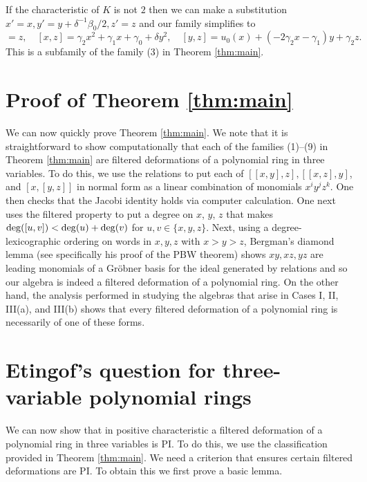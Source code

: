 \documentclass[a4paper,11pt,twoside,notitlepage,reqno]{amsart}
\theoremstyle{plain}
\numberwithin{thm}{section}
\theoremstyle{definition}
\begin{document}
If the characteristic of $K$ is not $2$ then we can make a substitution $x'=x, y'=y+\delta^{-1}\beta_0/2, z'=z$ and our family simplifies to
\begin{equation}
[x,y]=z,\quad [x,z]= \gamma_2 x^2 + \gamma_1 x + \gamma_0 +\delta y^2, \quad [y,z]=u_0(x) + (-2\gamma_2 x-\gamma_1)y +  \gamma_2 z.
\end{equation}
This is a subfamily of the family (3) in Theorem \ref{thm:main}.

\section{Proof of Theorem \ref{thm:main}}\label{sec:main}
We can now quickly prove Theorem \ref{thm:main}. We note that it is straightforward to show computationally that each of the families (1)--(9) in Theorem \ref{thm:main} are filtered deformations of a polynomial ring in three variables.  To do this, we use the relations to put each of $[[x,y],z], [[x,z],y]$, and $[x,[y,z]]$ in normal form as a linear combination of monomials $x^i y^j z^k$. One then checks that the Jacobi identity holds via computer calculation. One next uses the filtered property to put a degree on $x$, $y$, $z$ that makes 
${\rm deg}([u,v]) < {\rm deg}(u)+{\rm deg}(v)$ for $u,v\in \{x,y,z\}$.  Next, using a degree-lexicographic ordering on words in $x,y,z$ with $x>y>z$, Bergman's diamond lemma (see specifically his proof of the PBW theorem) \cite{Berg} shows $xy, xz, yz$ are leading monomials of a Gr\"obner basis for the ideal generated by relations and so our algebra is indeed a filtered deformation of a polynomial ring. On the other hand, the analysis performed in studying the algebras that arise in Cases I, II, III(a), and III(b) shows that every filtered deformation of a polynomial ring is necessarily of one of these forms.  

\section{Etingof's question for three-variable polynomial rings}\label{sec:et}
We can now show that in positive characteristic a filtered deformation of a polynomial ring in three variables is PI.  To do this, we use the classification provided in Theorem \ref{thm:main}. We need a criterion that ensures certain filtered deformations are PI.  To obtain this we first prove a basic lemma.
\end{document}
